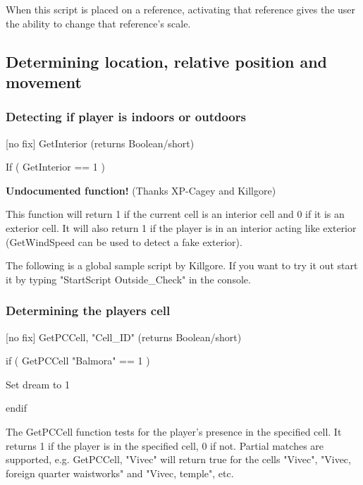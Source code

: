 \documentclass[
]{article}
\begin{document}
When this script is placed on a reference, activating that reference
gives the user the ability to change that reference's scale.



\hypertarget{determining-location-relative-position-and-movement}{%
\subsection{\texorpdfstring{\hfill\break
Determining location, relative position and
movement}{ Determining location, relative position and movement}}\label{determining-location-relative-position-and-movement}}

\hypertarget{detecting-if-player-is-indoors-or-outdoors}{%
\subsubsection{Detecting if player is indoors or
outdoors}\label{detecting-if-player-is-indoors-or-outdoors}}

{[}no fix{]} GetInterior (returns Boolean/short)

If ( GetInterior == 1 )

\textbf{Undocumented function!} (Thanks XP-Cagey and Killgore)

This function will return 1 if the current cell is an interior cell and
0 if it is an exterior cell. It will also return 1 if the player is in
an interior acting like exterior (GetWindSpeed can be used to detect a
fake exterior).

The following is a global sample script by Killgore. If you want to try
it out start it by typing "StartScript Outside\_Check" in the console.



\hypertarget{determining-the-players-cell}{%
\subsubsection{Determining the players
cell}\label{determining-the-players-cell}}

{[}no fix{]} GetPCCell, "Cell\_ID" (returns Boolean/short)

if ( GetPCCell "Balmora" == 1 )

Set dream to 1

endif

The GetPCCell function tests for the player's presence in the specified
cell. It returns 1 if the player is in the specified cell, 0 if not.
Partial matches are supported, e.g. GetPCCell, "Vivec" will return true
for the cells "Vivec", "Vivec, foreign quarter waistworks" and "Vivec,
temple", etc.
\end{document}
